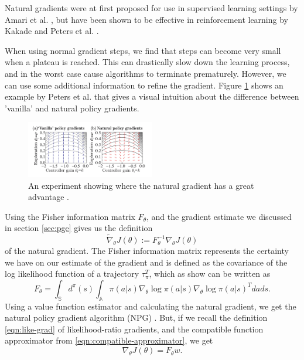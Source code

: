 \documentclass[final]{IEEEtran}
\begin{document}
Natural gradients were at first proposed for use in supervised learning settings by Amari et al. \cite{Amari:1998:NGW:287476.287477}, but have been shown to be effective in reinforcement learning by Kakade \cite{Kakade:2001} and Peters et al. \cite{4863}.

When using normal gradient steps, we find that steps can become very small when a plateau is reached. 
This can drastically slow down the learning process, and in the worst case cause algorithms to terminate prematurely. 
However, we can use some additional information to refine the gradient. 
Figure \ref{fig:nat-grad-adv} shows an example by Peters et al. \cite{Peters_IICHR_2003} that gives a visual intuition about the difference between 'vanilla' and natural policy gradients. 

\begin{figure}
  \includegraphics[width=0.5\textwidth]{nat-grad-adv}
  \caption{An experiment showing where the natural gradient has a great advantage \cite{Peters_IICHR_2003}. }\label{fig:nat-grad-adv}
\end{figure}

Using the Fisher information matrix $F_\theta$, and the gradient estimate we discussed in section \ref{sec:pge} gives us the definition
\begin{equation}
  \widetilde{\nabla}_\theta J(\theta) := F^{-1}_\theta \nabla_\theta J(\theta)
  \label{eqn:nat-grad}
\end{equation}
of the natural gradient. 
The Fisher information matrix represents the certainty we have on our estimate of the gradient and is defined as the covariance of the log likelihood function of a trajectory $\tau_{\pi}^T$, which as \cite{4863} show can be written as 
\begin{equation}
  F_\theta = \int_\mathbb{S} d^\pi(s) \int_\mathbb{A} \pi(a|s) \nabla_\theta \log{\pi(a|s)} \nabla_\theta \log{\pi(a|s)}^T dads.
  \label{eqn:F}
\end{equation}
Using a value function estimator and calculating the natural gradient, we get the natural policy gradient algorithm (NPG) \cite{NIPS2017_7233}.
But, if we recall the definition \eqref{eqn:like-grad} of likelihood-ratio gradients, and the compatible function approximator from \eqref{eqn:compatible-approximator}, we get
\begin{equation}
  \nabla_\theta J(\theta) = F_\theta w.
  \label{eqn:J-equals-F}
\end{equation}
\end{document}

